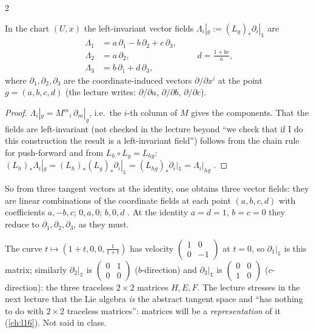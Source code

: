 \begin{paracol}{2}
\begin{theorem}\label{thm:sl-fields}
In the chart $(U,x)$ the left-invariant vector fields $\Lambda_i|_g:=(L_g)_*\partial_i|_{\mathbb 1}$ are
\[
  \begin{aligned}
  \Lambda_1&=a\,\partial_1-b\,\partial_2+c\,\partial_3,\\
  \Lambda_2&=a\,\partial_2,\\
  \Lambda_3&=b\,\partial_1+d\,\partial_3,
  \end{aligned}
  \qquad d=\tfrac{1+bc}{a},
\]
where $\partial_1,\partial_2,\partial_3$ are the coordinate-induced vectors $\partial/\partial x^i$ at the point $g=(a,b,c,d)$ (the lecture writes: $\partial/\partial a$, $\partial/\partial b$, $\partial/\partial c$).
\end{theorem}
\begin{proof}
$\Lambda_i|_g=M^m{}_i\,\partial_m|_g$, i.e.\ the $i$-th column of $M$ gives the components. That the fields are left-invariant (not checked in the lecture beyond ``we check that if I do this construction the result is a left-invariant field'') follows from the chain rule for push-forward and from $L_h\circ L_g=L_{hg}$: $(L_h)_*\Lambda_i|_g=(L_h)_*(L_g)_*\partial_i|_{\mathbb 1}=(L_{hg})_*\partial_i|_{\mathbb 1}=\Lambda_i|_{hg}$      .
\end{proof}
So from three tangent vectors at the identity, one obtains three vector fields: they are linear combinations of the coordinate fields at each point $(a,b,c,d)$ with coefficients $a,-b,c$; $0,a,0$; $b,0,d$ . At the identity $a=d=1$, $b=c=0$ they reduce to $\partial_1,\partial_2,\partial_3$, as they must.
\begin{coursenote}
The curve $t\mapsto(1+t,0,0,\frac1{1+t})$ has velocity $\begin{pmatrix}1&0\\0&-1\end{pmatrix}$ at $t=0$, so $\partial_1|_{\mathbb 1}$ is this matrix; similarly $\partial_2|_{\mathbb 1}$ is $\begin{pmatrix}0&1\\0&0\end{pmatrix}$ ($b$-direction) and $\partial_3|_{\mathbb 1}$ is $\begin{pmatrix}0&0\\1&0\end{pmatrix}$ ($c$-direction): the three traceless $2\times2$ matrices $H,E,F$. The lecture stresses in the next lecture that the Lie algebra \emph{is} the abstract tangent space and ``has nothing to do with $2\times2$ traceless matrices'': matrices will be a \emph{representation} of it (\cref{ch:l16}). Not said in class.
\end{coursenote}


\end{paracol}

